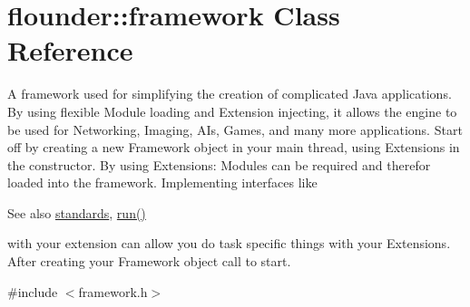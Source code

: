 \hypertarget{classflounder_1_1framework}{}\section{flounder\+:\+:framework Class Reference}
\label{classflounder_1_1framework}


A framework used for simplifying the creation of complicated Java applications. By using flexible Module loading and Extension injecting, it allows the engine to be used for Networking, Imaging, A\+Is, Games, and many more applications. Start off by creating a new Framework object in your main thread, using Extensions in the constructor. By using Extensions\+: Modules can be required and therefor loaded into the framework. Implementing interfaces like \begin{DoxySeeAlso}{See also}
\hyperlink{classflounder_1_1standards}{standards}, \hyperlink{classflounder_1_1framework_aa3a73c8e8f5f0c6ccef3e4de89982434}{run()}


\end{DoxySeeAlso}
with your extension can allow you do task specific things with your Extensions. After creating your Framework object call  to start.  




{\ttfamily \#include $<$framework.\+h$>$}

